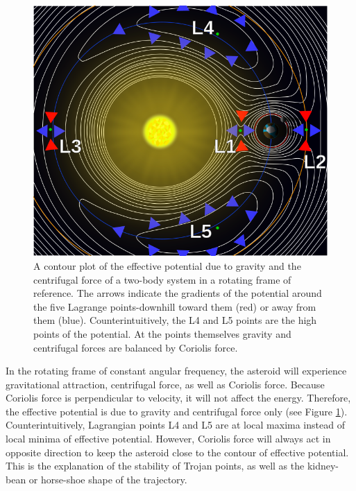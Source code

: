 \documentclass[12pt,a4paper]{article}
\begin{document}
\begin{figure}[H]
\centering
\includegraphics[width=5in]{704px-Lagrange_points2.png}
\caption{A contour plot of the effective potential due to gravity and the centrifugal force of a two-body system in a rotating frame of reference. The arrows indicate the gradients of the potential around the five Lagrange points-downhill toward them (red) or away from them (blue). Counterintuitively, the L4 and L5 points are the high points of the potential. At the points themselves gravity and centrifugal forces are balanced by Coriolis force.}
\label{fig:potential}
\end{figure}

In the rotating frame of constant angular frequency, the asteroid will experience gravitational attraction, centrifugal force, as well as Coriolis force. Because Coriolis force is perpendicular to velocity, it will not affect the energy. Therefore, the effective potential is due to gravity and centrifugal force only (see Figure \ref{fig:potential}). Counterintuitively, Lagrangian points L4 and L5 are at local maxima instead of local minima of effective potential. However, Coriolis force will always act in opposite direction to keep the asteroid close to the contour of effective potential. This is the explanation of the stability of Trojan points, as well as the kidney-bean or horse-shoe shape of the trajectory.
\end{document}
